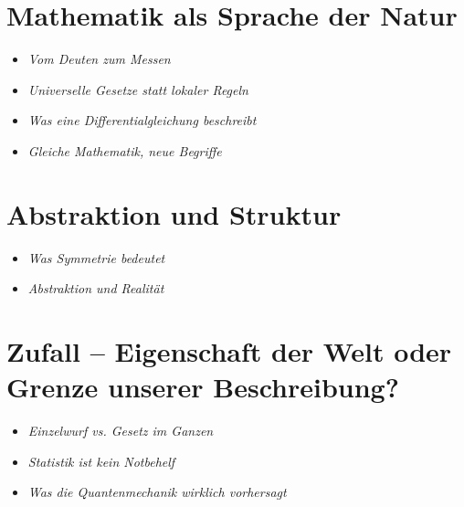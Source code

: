 \section{Mathematik als Sprache der Natur}
\begin{HistoryBox}
	
	\begin{itemize}
		\item \emph{Vom Deuten zum Messen}\dotfill \pageref{box:messen}
		\item \emph{Universelle Gesetze statt lokaler Regeln}\dotfill \pageref{box:gesetze}
	\end{itemize}
\end{HistoryBox}

\begin{DidacticBox}[Didaktikboxen]
	\begin{itemize}
		\item \emph{Was eine Differentialgleichung beschreibt}\dotfill \pageref{box:differential}
		\item \emph{Gleiche Mathematik, neue Begriffe}\dotfill \pageref{box:neuebegriffe}
	
	\end{itemize}
\end{DidacticBox}


\section{Abstraktion und Struktur}
\begin{DidacticBox}[Didaktikboxen]
	\begin{itemize}
		\item \emph{Was Symmetrie bedeutet}\dotfill \pageref{box:symmetrie}
	
			\item \emph{Abstraktion und Realität}\dotfill \pageref{box:abstraktion}
	\end{itemize}
\end{DidacticBox}




\section{Zufall -- Eigenschaft der Welt oder Grenze unserer Beschreibung?}


\begin{DidacticBox}[Didaktikboxen]
	\begin{itemize}
		\item \emph{Einzelwurf vs. Gesetz im Ganzen}\dotfill \pageref{box:einzelwurf}
		\item \emph{Statistik ist kein Notbehelf}\dotfill \pageref{box:statistik}
		\item \emph{Was die Quantenmechanik wirklich vorhersagt}\dotfill \pageref{box:vorhersagt}
	\end{itemize}
\end{DidacticBox}




